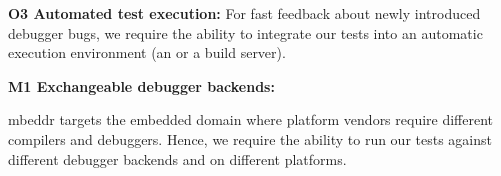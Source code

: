 \textbf{\label{O3}O3 Automated test execution:} For fast
feedback about newly introduced debugger bugs, 
we require the ability to integrate our 
tests into an automatic execution environment (\eg an  or a build
server).

\textbf{\label{M1}M1 Exchangeable debugger backends:}

mbeddr targets the embedded domain where platform vendors require different
compilers and debuggers. Hence, we require the ability to run our tests against
different debugger backends and on different platforms. 
